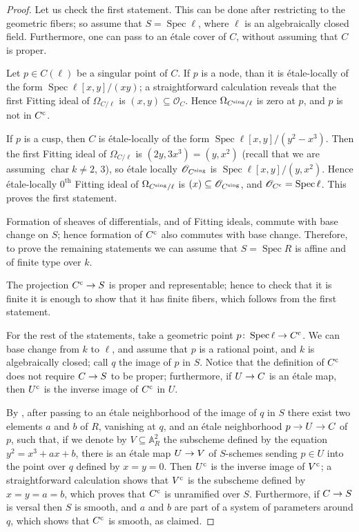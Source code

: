 \documentclass[a4paper, 10pt]{amsart}
\numberwithin{equation}{section}
\numberwithin{subsection}{section}
\theoremstyle{definition}
\theoremstyle{remark}
\renewcommand{\mathcal}{\mathscr}
\newcommand\cO{\mathcal{O}} \newcommand\cP{\mathcal{P}}
\renewcommand\AA{\mathbb{A}} \newcommand\BB{\mathbb{B}}
\newcommand\arr{\ifinner\to\else\longrightarrow\fi}
\renewcommand\th{^\text{th}}
\newcommand\spec{\operatorname{Spec}}
\newcommand{\cha}{\operatorname{char}}
\newcommand{\cu}{^{\rm c}}
\newcommand{\sing}{^{\rm sing}}
\newcommand{\modangelo}{\marginpar{}}
\begin{document}
	\begin{proof} \modangelo
	Let us check the first statement. This can be done after restricting to the geometric fibers; so assume that $S = \spec\ell$, where $\ell$ is an algebraically closed field. Furthermore, one can pass to an \'{e}tale cover of $C$, without assuming that $C$ is proper.
		
Let $p \in C(\ell)$ be a singular point of $C$. If $p$ is a node, than it is \'{e}tale-locally of the form $\spec\ell[x,y]/(xy)$; a straightforward calculation reveals that the first Fitting ideal of $\Omega_{C/\ell}$ is $(x,y) \subseteq \cO_{C}$. Hence $\Omega_{C\sing/\ell}$ is zero at $p$, and $p$ is not in $C\cu$.

If $p$ is a cusp, then $C$ is \'{e}tale-locally of the form $\spec\ell[x,y]/(y^{2} - x^{3})$. Then the first Fitting ideal of $\Omega_{C/\ell}$ is $(2y,3x^{3}) = (y, x^{2})$ (recall that we are assuming $\cha k \neq 2$, $3$), so \'{e}tale locally $\cO_{C\sing}$ is $\spec\ell[x,y]/(y, x^{2})$. Hence \'{e}tale-locally $0\th$ Fitting ideal of $\Omega_{C\sing/\ell}$ is $(x)\subseteq \cO_{C\sing}$, and $\cO_{C\cu} = \spec \ell$. This proves the first statement.
		
		Formation of sheaves of differentials, and of Fitting ideals, commute with base change on $S$; hence formation of $C\cu$ also commutes with base change. Therefore, to prove the remaining statements we can assume that $S = \spec R$ is affine and of finite type over $k$. 
		
		The projection $C\cu \arr S$ is proper and representable; hence to check that it is finite it is enough to show that it has finite fibers, which follows from the first statement. 
		
		For the rest of the statements, take a geometric point $p\colon \spec\ell \arr C\cu$. We can base change from $k$ to $\ell$, and assume that $p$ is a rational point, and $k$ is algebraically closed; call $q$ the image of $p$ in $S$. Notice that the definition of $C\cu$ does not require $C \arr S$ to be proper; furthermore, if $U \arr C$ is an \'{e}tale map, then $U\cu$ is the inverse image of $C\cu$ in $U$. 
		
		By \cite[Example~6.46]{mattia-vistoli-deformation}, after passing to an \'{e}tale neighborhood of the image of $q$ in $S$ there exist two elements $a$ and $b$ of $R$, vanishing at $q$, and an \'{e}tale neighborhood $p \arr U \arr C$ of $p$, such that, if we denote by $V \subseteq \AA^{2}_{R}$ the subscheme defined by the equation $y^{2} = x^{3} + ax + b$, there is an \'{e}tale map $U \arr V$ of $S$-schemes sending $p \in U$ into the point over $q$ defined by $x = y = 0$. Then $U\cu$ is the inverse image of $V\cu$; a straightforward calculation shows that $V\cu$ is the subscheme defined by $x = y = a = b$, which proves that $C\cu$ is unramified over $S$. Furthermore, if $C \arr S$ is versal then $S$ is smooth, and $a$ and $b$ are part of a system of parameters around $q$, which shows that $C\cu$ is smooth, as claimed.
	\end{proof}
\end{document}
